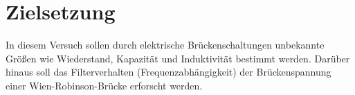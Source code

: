 \section{Zielsetzung}
\label{sec:Zielsetzung}

In diesem Versuch sollen durch elektrische Brückenschaltungen unbekannte Größen 
wie Wiederstand, Kapazität und Induktivität bestimmt werden. Darüber hinaus 
soll das Filterverhalten (Frequenzabhängigkeit) der Brückenspannung einer 
Wien-Robinson-Brücke erforscht werden.